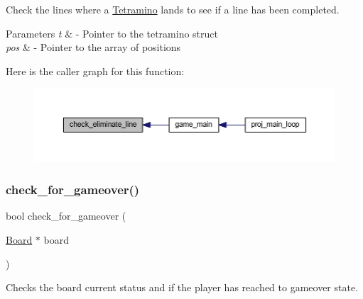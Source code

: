 Check the lines where a \mbox{\hyperlink{struct_tetramino}{Tetramino}} lands to see if a line has been completed. 


\begin{DoxyParams}{Parameters}
{\em t} & -\/ Pointer to the tetramino struct \\
\hline
{\em pos} & -\/ Pointer to the array of positions \\
\hline
\end{DoxyParams}
Here is the caller graph for this function\+:
\nopagebreak
\begin{figure}[H]
\begin{center}
\leavevmode
\includegraphics[width=350pt]{group__tetramino_gaab50f02f99355b3ceb43290e186fe609_icgraph}
\end{center}
\end{figure}
\mbox{\label{group__tetramino_gaed055860f4584eb217234f06c29d3ab4}} 
\subsubsection{\texorpdfstring{check\+\_\+for\+\_\+gameover()}{check\_for\_gameover()}}
{\footnotesize\ttfamily bool check\+\_\+for\+\_\+gameover (\begin{DoxyParamCaption}\item[{\mbox{\hyperlink{struct_board}{Board}} $\ast$}]{board }\end{DoxyParamCaption})}



Checks the board current status and if the player has reached to gameover state. 


